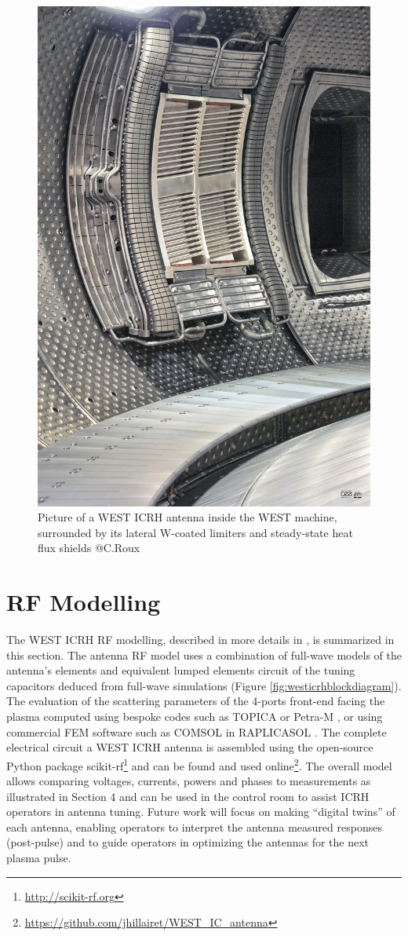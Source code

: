 \documentclass[12p]{iopart}
\begin{document}
\begin{figure}
	\centering
	\includegraphics[width=0.7\linewidth]{figures/6}
	\caption{Picture of a WEST ICRH antenna inside the WEST machine, surrounded by its lateral W-coated limiters and steady-state heat flux shields @C.Roux}
	\label{fig:ICRH_antenna_inside_WEST}
\end{figure}





\section{RF Modelling}
The WEST ICRH RF modelling, described in more details in \cite{helou2015-2, hillairet2020-2}, is summarized in this section. The antenna RF model uses a combination of full-wave models of the antenna’s elements and equivalent lumped elements circuit of the tuning capacitors deduced from full-wave simulations (Figure \ref{fig:westicrhblockdiagram}). The evaluation of the scattering parameters of the 4-ports front-end facing the plasma computed using bespoke codes such as TOPICA \cite{milanesio2009} or Petra-M \cite{bertelli2020, shiraiwa2021}, or using commercial FEM software such as COMSOL in RAPLICASOL \cite{tierens2020-2}. The complete electrical circuit a WEST ICRH antenna is assembled using the open-source Python package scikit-rf\footnote{\url{http://scikit-rf.org}}  and can be found and used online\footnote{\url{https://github.com/jhillairet/WEST_IC_antenna}}. The overall model allows comparing voltages, currents, powers and phases to measurements as illustrated in Section 4 and can be used in the control room to assist ICRH operators in antenna tuning. Future work will focus on making “digital twins” of each antenna, enabling operators to interpret the antenna measured responses (post-pulse) and to guide operators in optimizing the antennas for the next plasma pulse.
\end{document}

